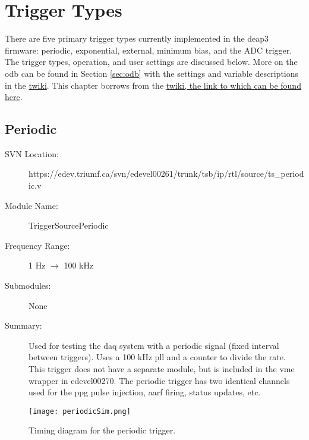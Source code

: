 \chapter{Trigger Types}
\label{chap:triggers}

There are five primary trigger types currently implemented in the \gls{deap3} firmware: periodic, exponential, external, minimum bias, and the ADC trigger. The trigger types, operation, and user settings are discussed below. More on the \gls{odb} can be found in Section \ref{sec:odb} with the settings and variable descriptions in the \href{https://www.snolab.ca/deap/private/TWiki/bin/view/Main/Dtmodb}{twiki}. This chapter borrows from the \href{https://www.snolab.ca/deap/private/TWiki/bin/view/Main/Triggerproject}{twiki, the link to which can be found here}.

\section{Periodic}
\label{sec:periodicTrigger}

\begin{description}
\item[SVN Location: ]https://edev.triumf.ca/svn/edevel00261/trunk/tsb/ip/rtl/source/ts\_periodic.v
\item[Module Name: ]TriggerSourcePeriodic
\item[Frequency Range: ]1 Hz $\rightarrow$ 100 kHz
\item[Submodules: ]None
\item[Summary: ]Used for testing the \gls{daq} system with a periodic signal (fixed interval between triggers). Uses a 100 kHz \gls{pll} and a counter to divide the rate. This trigger does not have a separate module, but is included in the \gls{vme} wrapper in edevel00270\footnotemark[\value{footnote}]. The periodic trigger has two identical channels used for the \gls{ppg} pulse injection, \gls{aarf} firing, status updates, etc.
\end{description}

\begin{landscape}
	\vspace*{\fill}
	\begin{figure}[ht]
	\centering
	\texttt{[image: periodicSim.png]}
	\caption{Timing diagram for the periodic trigger.}
	\label{Fig:periodicTime}
	\end{figure}
	\vspace*{\fill}
\end{landscape}

